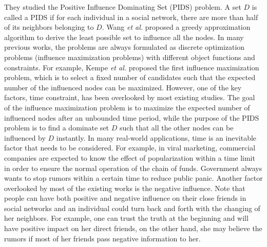 They studied the Positive Influence Dominating Set (PIDS) problem.
A set $D$ is called a PIDS if for each individual in a social network, there are more than half of its neighbors belonging to $D$.
Wang {\it et al.} proposed a greedy approximation algorithm to derive the least possible set to influence all the nodes.
In many previous works, the problems are always formulated as discrete optimization problems (influence maximization problems) with different object functions and constraints.
For example, Kempe {\it et al.} \cite{KKT2003} proposed the first influence maximization problem, which is to select a fixed number of candidates such that the
expected number of the influenced nodes can be maximized.
However, one of the key factors, time constraint, has been overlooked by most existing studies.
The goal of the influence maximization problem is to maximize the expected number of influenced nodes after an unbounded time period,
while the purpose of the PIDS problem is to find a dominate set $D$ such that all the other nodes can be influenced by $D$ instantly.
In many real-world applications, time is an inevitable factor that needs to be considered.
For example, in viral marketing, commercial companies are expected to know the effect of popularization within a time limit in order to ensure the normal
operation of the chain of funds.
Government always wants to stop rumors within a certain time to reduce public panic.
Another factor overlooked by most of the existing works is the negative influence.
Note that people can have both positive and negative influence on their close friends in social networks
and an individual could turn back and forth with the changing of her neighbors.
For example, one can trust the truth at the beginning and will have positive impact on her direct friends, on the other hand, she may believe the rumors if most of her friends pass negative information to her.

